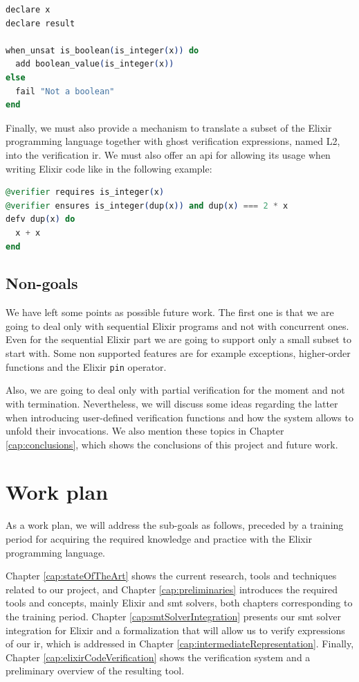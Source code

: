 \begin{lstlisting}[language=elixir,numbers=none,frame=none]
declare x
declare result 

when_unsat is_boolean(is_integer(x)) do 
  add boolean_value(is_integer(x))
else 
  fail "Not a boolean"
end
\end{lstlisting}

Finally, we must also provide a mechanism to translate a subset of the Elixir
programming language together with ghost verification expressions, named L2,
into the verification \gls{ir}. We must also offer an \gls{api} for allowing its
usage when writing Elixir code like in the following example:

\begin{lstlisting}[language=elixir,numbers=none,frame=none]
@verifier requires is_integer(x)
@verifier ensures is_integer(dup(x)) and dup(x) === 2 * x
defv dup(x) do
  x + x
end
\end{lstlisting}

\subsection{Non-goals}

We have left some points as possible future work. The first one is that we are
going to deal only with sequential Elixir programs and not with concurrent ones.
Even for the sequential Elixir part we are going to support only a small subset 
to start with. Some non supported features are for example exceptions,
higher-order functions and the Elixir \verb|pin| operator.

Also, we are going to deal only with partial verification for the moment and not
with termination. Nevertheless, we will discuss some ideas regarding the latter
when introducing user-defined verification functions and how the system allows
to unfold their invocations. We also mention these topics in Chapter
\ref{cap:conclusions}, which shows the conclusions of this project and future
work.

\section{Work plan}

As a work plan, we will address the sub-goals as follows, preceded by a training
period for acquiring the required knowledge and practice with the Elixir
programming language.

Chapter \ref{cap:stateOfTheArt} shows the current research, tools and techniques
related to our project, and Chapter \ref{cap:preliminaries} introduces the
required tools and concepts, mainly Elixir and \acrshort{smt} solvers, both
chapters corresponding to the training period. Chapter
\ref{cap:smtSolverIntegration} presents our \acrshort{smt} solver integration
for Elixir and a formalization that will allow us to verify expressions of our
\gls{ir}, which is addressed in Chapter \ref{cap:intermediateRepresentation}.
Finally, Chapter \ref{cap:elixirCodeVerification} shows the verification system
and a preliminary overview of the resulting tool.
